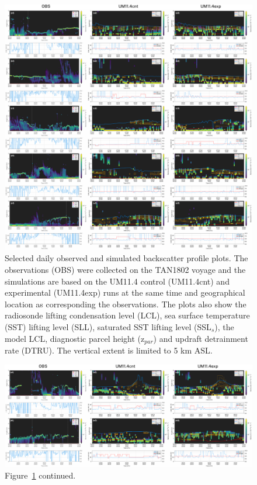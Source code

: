 \begin{figure}[p]
\centering
\centerline{\includegraphics[width=1.12\textwidth]{chapter4/fig/examples.pdf}}
\caption[Selected daily observed and simulated backscatter profile plots]{Selected daily observed and simulated backscatter profile plots.
The observations (OBS) were collected on the TAN1802 voyage and the
simulations are based on the UM11.4 control (UM11.4cnt) and experimental (UM11.4exp) runs
at the same time and geographical location as corresponding the observations.
The plots also show the radiosonde lifting condensation level (LCL), sea surface temperature (SST) lifting level (SLL), saturated SST lifting level (SSL$_s$), the model LCL, diagnostic parcel height (z$_{par}$) and
updraft detrainment rate (DTRU). The vertical extent is limited to 5 km ASL.
}
\label{fig:4:examples}
\end{figure}

\begin{figure}[t]
\centering
\centerline{\includegraphics[width=1.12\textwidth]{chapter4/fig/examples_cont.pdf}}
\caption{Figure~\ref{fig:4:examples} continued.
}
\label{fig:4:examples-cont}
\end{figure}

